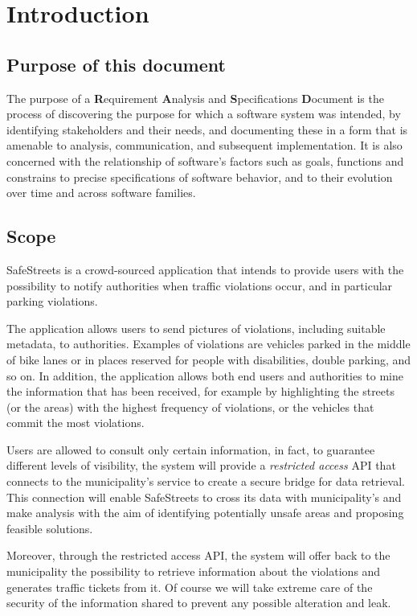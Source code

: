 \section{Introduction}
\subsection{Purpose of this document}
The purpose of a \textbf{R}equirement \textbf{A}nalysis and \textbf{S}pecifications \textbf{D}ocument is the process of discovering the purpose for which a software system was intended, by identifying stakeholders and their needs, and documenting these in a form that is amenable to analysis, communication, and subsequent implementation. \cite{RE} It is also concerned with the relationship of software's factors such as goals, functions and constrains to precise specifications of software behavior, and to their evolution over time and across software families.\cite{Zave}

\subsection{Scope}

	SafeStreets is a crowd-­sourced application that intends to provide users with the possibility to notify authorities when traffic violations occur, and in particular parking violations. 

	The application allows users to send pictures of violations, including suitable metadata, to authorities. Examples of violations are vehicles parked in the middle of bike lanes or in places reserved for people with disabilities, double parking, and so on. In addition, the application allows both end users and authorities to mine the information that has been received, for example by highlighting the streets (or the areas) with the highest frequency of violations, or the vehicles that commit the most violations. 
	
	Users are allowed to consult only certain information, in fact, to guarantee different levels of visibility, the system  will provide a \emph{restricted access} API that connects to the municipality's service to create a secure bridge for data retrieval. This connection will enable SafeStreets to cross its data with municipality's and make analysis with the aim of identifying potentially unsafe areas and proposing feasible solutions.
	
	Moreover, through the restricted access API, the system will offer back to the municipality the possibility to retrieve information about the violations and generates traffic tickets from it. Of course we will take extreme care of the security of the information shared to prevent any possible alteration and leak.
	
